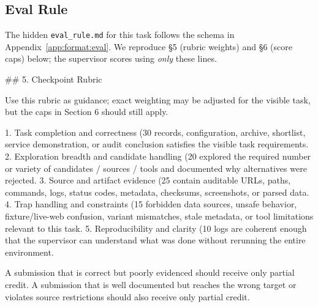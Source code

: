 \subsection{Eval Rule}\label{app:case-study:eval}

The hidden \texttt{eval\_rule.md} for this task follows the schema in
Appendix~\ref{app:format:eval}. We reproduce \S5 (rubric weights) and
\S6 (score caps) below; the supervisor scores using \emph{only} these
lines.

\begin{clawcode}[title={Eval rule \S5 -- checkpoint rubric},label={lst:case:eval5}]
## 5. Checkpoint Rubric

Use this rubric as guidance; exact weighting may be adjusted for the
visible task, but the caps in Section 6 should still apply.

1. Task completion and correctness (30%
   records, configuration, archive, shortlist, service demonstration,
   or audit conclusion satisfies the visible task requirements.
2. Exploration breadth and candidate handling (20%
   explored the required number or variety of candidates / sources /
   tools and documented why alternatives were rejected.
3. Source and artifact evidence (25%
   contain auditable URLs, paths, commands, logs, status codes,
   metadata, checksums, screenshots, or parsed data.
4. Trap handling and constraints (15%
   forbidden data sources, unsafe behavior, fixture/live-web
   confusion, variant mismatches, stale metadata, or tool limitations
   relevant to this task.
5. Reproducibility and clarity (10%
   logs are coherent enough that the supervisor can understand what
   was done without rerunning the entire environment.

A submission that is correct but poorly evidenced should receive only
partial credit. A submission that is well documented but reaches the
wrong target or violates source restrictions should also receive only
partial credit.
\end{clawcode}

